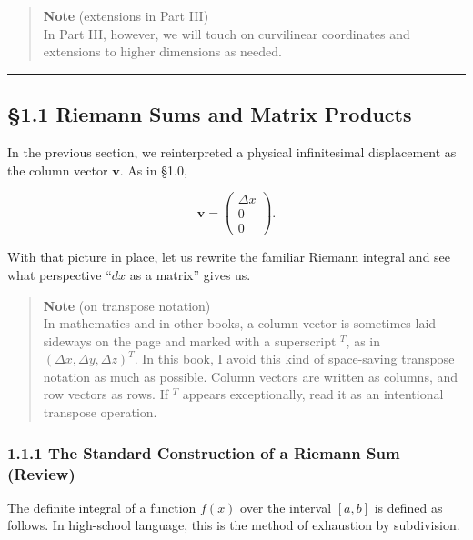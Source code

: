 \begin{quote}
\textbf{Note} (extensions in Part III)\\
In Part III, however, we will touch on curvilinear coordinates and
extensions to higher dimensions as needed.
\end{quote}

\begin{center}\rule{0.5\linewidth}{0.5pt}\end{center}

\hypertarget{riemann-sums-and-matrix-products}{%
\subsection{§1.1 Riemann Sums and Matrix
Products}\label{riemann-sums-and-matrix-products}}

In the previous section, we reinterpreted a physical infinitesimal
displacement as the column vector \(\mathbf{v}\). As in §1.0,

\[
\mathbf{v} = \begin{pmatrix} \Delta x \\ 0 \\ 0 \end{pmatrix}.
\]

With that picture in place, let us rewrite the familiar Riemann integral
and see what perspective ``\(dx\) as a matrix'' gives us.

\begin{quote}
\textbf{Note} (on transpose notation)\\
In mathematics and in other books, a column vector is sometimes laid
sideways on the page and marked with a superscript \({}^T\), as in
\((\Delta x,\Delta y,\Delta z)^T\). In this book, I avoid this kind of
space-saving transpose notation as much as possible. Column vectors are
written as columns, and row vectors as rows. If \({}^T\) appears
exceptionally, read it as an intentional transpose operation.
\end{quote}

\hypertarget{the-standard-construction-of-a-riemann-sum-review}{%
\subsubsection{1.1.1 The Standard Construction of a Riemann Sum
(Review)}\label{the-standard-construction-of-a-riemann-sum-review}}

The definite integral of a function \(f(x)\) over the interval \([a,b]\)
is defined as follows. In high-school language, this is the method of
exhaustion by subdivision.

